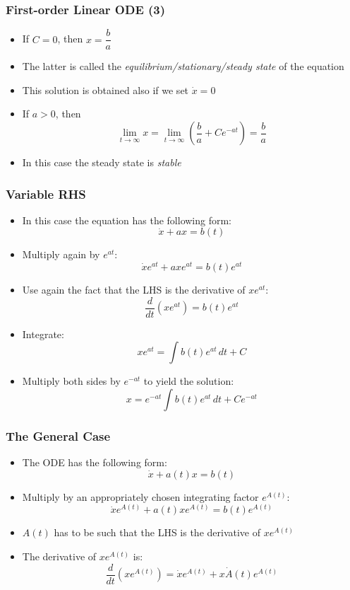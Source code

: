 \documentclass[10pt,usenames,dvipsnames]{beamer}
\theoremstyle{definition}
\begin{document}
\begin{frame}[fragile]
\frametitle{First-order Linear ODE (3)}
\begin{itemize}
	\item If $C = 0$, then $\displaystyle x = \dfrac{b}{a}$
	\item The latter is called the \textit{equilibrium/stationary/steady state} of the equation
	\item This solution is obtained also if we set $\dot{x} = 0$
	\item If $a > 0$, then
	\[
		\lim_{t\to\infty}x = \lim_{t\to\infty}\left(\dfrac{b}{a} + Ce^{-at}\right) = \dfrac{b}{a}
	\]
	\item In this case the steady state is \textit{stable}
\end{itemize}
\end{frame}

\begin{frame}[fragile]
\frametitle{Variable RHS}
\begin{itemize}
	\item In this case the equation has the following form:
	\[
		\dot{x} + ax = b(t)
	\]
	\item Multiply again by $e^{at}$:
	\[
		\dot{x}e^{at} + axe^{at} = b(t)e^{at}
	\]
	\item Use again the fact that the LHS is the derivative of $xe^{at}$:
	\[
		\dfrac{d}{dt}(xe^{at}) = b(t)e^{at}
	\]
	\item Integrate:
	\[
		xe^{at} = \int b(t)e^{at}\, dt + C 
	\]
	\item Multiply both sides by $e^{-at}$ to yield the solution:
	\[
		x = e^{-at}\int b(t)e^{at}\, dt + C e^{-at}
	\]
\end{itemize}
\end{frame}

\begin{frame}[fragile]
\frametitle{The General Case}
\begin{itemize}
	\item The ODE has the following form:
	\[
		\dot{x} + a(t)x = b(t)
	\]
	\item Multiply by an appropriately chosen integrating factor $e^{A(t)}$:
	\[
		\dot{x}e^{A(t)} + a(t)xe^{A(t)} = b(t)e^{A(t)}
	\]
	\item $A(t)$ has to be such that the LHS is the derivative of $xe^{A(t)}$
	\item The derivative of $xe^{A(t)}$ is:
	\[
		\dfrac{d}{dt}(xe^{A(t)}) = \dot{x}e^{A(t)} + x\dot{A}(t)e^{A(t)}
	\]
\end{itemize}
\end{frame}
\end{document}
